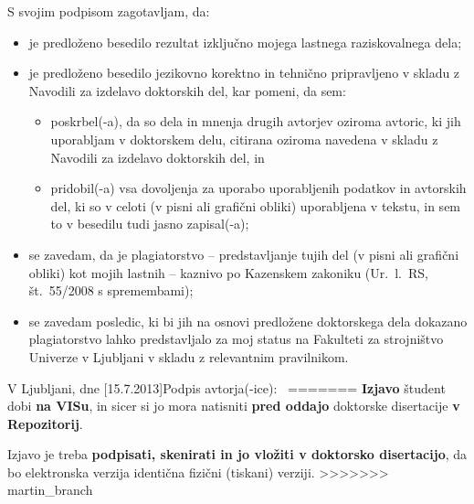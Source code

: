 S svojim podpisom zagotavljam, da:
\begin{itemize}[label={-}]

\item je predloženo besedilo rezultat izključno mojega lastnega raziskovalnega dela;
\item je predloženo besedilo jezikovno korektno in tehnično pripravljeno v skladu z Navodili za izdelavo doktorskih del, kar pomeni, da sem:
\begin{itemize}[label={-}]
\item poskrbel(-a), da so dela in mnenja drugih avtorjev oziroma avtoric, ki jih uporabljam v doktorskem delu, citirana oziroma navedena v skladu z Navodili za izdelavo doktorskih del, in
\item pridobil(-a) vsa dovoljenja za uporabo uporabljenih podatkov in avtorskih del, ki so v celoti (v pisni ali grafični obliki) uporabljena v tekstu, in sem to v besedilu tudi jasno zapisal(-a);
\end{itemize}
\item se zavedam, da je plagiatorstvo – predstavljanje tujih del (v pisni ali grafični obliki) kot mojih lastnih – kaznivo po Kazenskem zakoniku (Ur.\ l.\ RS, št.\ 55/2008 s spremembami);
\item se zavedam posledic, ki bi jih na osnovi predložene doktorskega dela dokazano plagiatorstvo lahko predstavljalo za moj status na Fakulteti za strojništvo Univerze v Ljubljani v skladu z relevantnim pravilnikom.
\end{itemize}
\vspace{2cm}
V Ljubljani, dne [15.7.2013]\hfill Podpis avtorja(-ice):~\underline{\hspace{4cm}} 
=======
\vspace{-2mm}
\textbf{Izjavo} študent dobi \textbf{na VISu}, in sicer si jo mora natisniti \textbf{pred oddajo} doktorske disertacije \textbf{v Repozitorij}.\newline

Izjavo je treba \textbf{podpisati, skenirati in jo vložiti v doktorsko disertacijo}, da bo elektronska verzija identična fizični (tiskani) verziji.
>>>>>>> martin_branch
